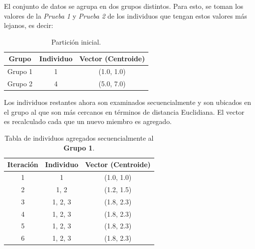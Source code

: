 \begin{UClist}
	\UCli El conjunto de datos se agrupa en dos grupos distintos. Para esto, se toman los valores de la \emph{Prueba 1} y \emph{Prueba 2} de los individuos que tengan estos valores más lejanos, es decir:\\

	\begin{table}[H]
		\begin{center}
			\label{tab:gruposInicialesKMeans}
			\begin{tabular}{c|c|c}
				\textbf{Grupo} & \textbf{Individuo} & \textbf{Vector (Centroide)}\\
				\hline
				Grupo 1 & 1 & (1.0, 1.0)\\
				Grupo 2 & 4 & (5.0, 7.0)\\
			\end{tabular}
		\end{center}
		\caption{Partición inicial.}
	\end{table}

	\UCli Los individuos restantes ahora son examinados secuencialmente y son ubicados en el grupo al que son más cercanos en términos de distancia Euclidiana. El vector es recalculado cada que un nuevo miembro es agregado.

	\begin{table}[H]
		\begin{center}
			\label{tab:gruposIndividuosCompletosGrupo1}
			\begin{tabular}{c|c|c}
				\textbf{Iteración} & \textbf{Individuo} & \textbf{Vector (Centroide)}\\
				\hline
				1 & 1 & (1.0, 1.0)\\
				2 & 1, 2 & (1.2, 1.5)\\
				3 & 1, 2, 3 & (1.8, 2.3)\\
				4 & 1, 2, 3 & (1.8, 2.3)\\
				5 & 1, 2, 3 & (1.8, 2.3)\\
				6 & 1, 2, 3 & (1.8, 2.3)\\
			\end{tabular}
		\end{center}
		\caption{Tabla de individuos agregados secuencialmente al \textbf{Grupo 1}.}
	\end{table}


\end{UClist}
